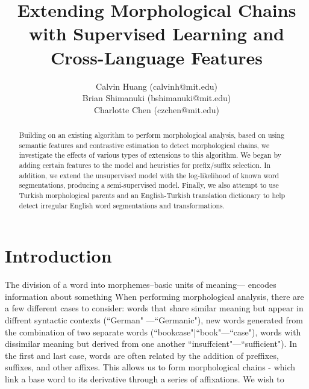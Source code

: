 \documentclass[11pt,twocolumn]{article}
\begin{document}
 
\title{Extending Morphological Chains with Supervised Learning and Cross-Language Features}

\author{Calvin Huang (calvinh@mit.edu)\\
    Brian Shimanuki (bshimanuki@mit.edu)\\
    Charlotte Chen (czchen@mit.edu)
\\
}

\maketitle
\thispagestyle{empty}

\begin{abstract}
    Building on an existing algorithm to perform morphological analysis,
    based on using semantic features and contrastive estimation to detect morphological chains,
    we investigate the effects of various types of extensions to this algorithm.
    We began by adding certain features to the model and heuristics for prefix/suffix selection.
    In addition, we extend the unsupervised model with the log-likelihood of known word segmentations,
    producing a semi-supervised model.
    Finally, we also attempt to use Turkish morphological parents and an English-Turkish translation
    dictionary to help detect irregular English word segmentations and transformations.
\end{abstract}

\section{Introduction}
The division of a word into morphemes--basic units of meaning--- encodes information about
something
When performing morphological analysis, there are a few different cases to consider: words that share similar
meaning but appear in diffrent syntactic contexts (``German" ---``Germanic"), new words generated from
the combination of two separate words (``bookcase"|``book"---``case"), words with dissimilar meaning but
derived from one another ``insuffcient"---``sufficient"). In the first and last case, words are often related
by the addition of preffixes, suffixes, and other affixes. This allows us to form morphological chains - which
link a base word to its derivative through a series of affixations.
We wish to 

\end{document}
